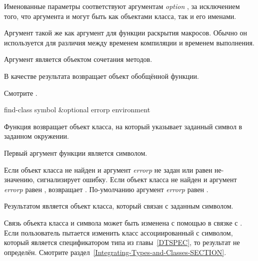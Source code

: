 \begin{defun}[Функция]
Именованные параметры соответствуют аргументам \emph{option} ,
за исключением того, что аргумента  и
 могут быть как объектами класса, так и его именами.

Аргумент  такой же как аргумент  для функции
раскрытия макросов. Обычно он используется для различия между временем
компиляции и временем выполнения.

Аргумент  является объектом сочетания методов.

В качестве результата возвращает объект обобщённой функции.

Смотрите .
\end{defun}

\begin{defun}[Функция]
find-class symbol &optional errorp environment

Функция  возвращает объект класса, на который указывает
заданный символ в заданном окружении.

Первый аргумент функции является символом.

Если объект класса не найден и аргумент \emph{errorp} не задан или равен
не- значению,  сигнализирует ошибку.
Если объект класса не найден и аргумент \emph{errorp} равен ,
 возвращает . По-умолчанию аргумент \emph{errorp} равен
.

Результатом  является объект класса, который связан с заданным
символом.

Связь объекта класса и символа может быть изменена с помощью  в связке
с . Если пользователь пытается изменить класс ассоциированный с
символом, который является спецификатором типа из главы~\ref{DTSPEC}, то
результат не определён.
Смотрите раздел~\ref{Integrating-Types-and-Classes-SECTION}.
\end{defun}



